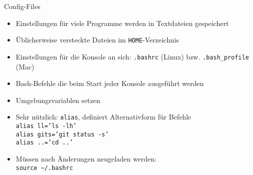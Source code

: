 \begin{frame}{Config-Files}
  \begin{itemize}
    \item Einstellungen für viele Programme werden in Textdateien gespeichert
    \item Üblicherweise versteckte Dateien im \texttt{HOME}-Verzeichnis
    \item Einstellungen für die Konsole an sich: \texttt{.bashrc} (Linux) bzw. \texttt{.bash\_profile} (Mac)
    \item Bash-Befehle die beim Start jeder Konsole ausgeführt werden
    \item Umgebungsvariablen setzen
    \item Sehr nützlich: \texttt{alias}, definiert Alternativform für Befehle \\
      \texttt{alias ll='ls -lh'} \\
      \texttt{alias gits='git status -s'} \\
      \texttt{alias ..='cd ..'}
    \item Müssen nach Änderungen neugeladen werden:\\
      \texttt{source \textasciitilde/.bashrc}
  \end{itemize}
  
  
\end{frame}
